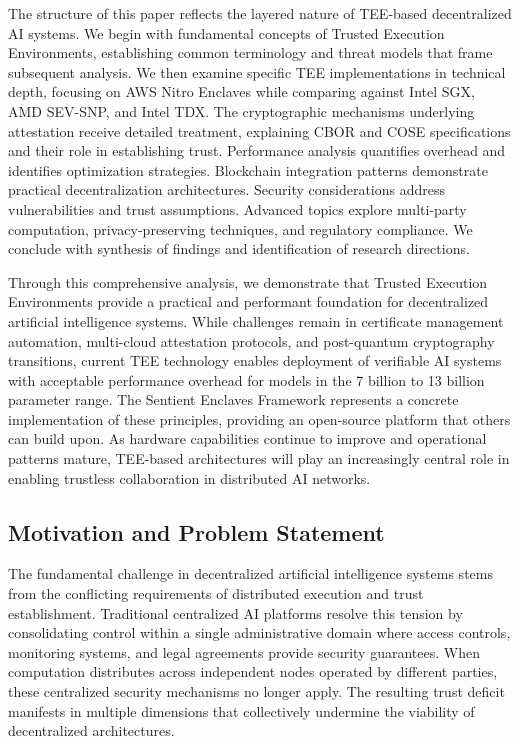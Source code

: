 The structure of this paper reflects the layered nature of TEE-based decentralized AI systems. We begin with fundamental concepts of Trusted Execution Environments, establishing common terminology and threat models that frame subsequent analysis. We then examine specific TEE implementations in technical depth, focusing on AWS Nitro Enclaves while comparing against Intel SGX, AMD SEV-SNP, and Intel TDX. The cryptographic mechanisms underlying attestation receive detailed treatment, explaining CBOR and COSE specifications and their role in establishing trust. Performance analysis quantifies overhead and identifies optimization strategies. Blockchain integration patterns demonstrate practical decentralization architectures. Security considerations address vulnerabilities and trust assumptions. Advanced topics explore multi-party computation, privacy-preserving techniques, and regulatory compliance. We conclude with synthesis of findings and identification of research directions.

Through this comprehensive analysis, we demonstrate that Trusted Execution Environments provide a practical and performant foundation for decentralized artificial intelligence systems. While challenges remain in certificate management automation, multi-cloud attestation protocols, and post-quantum cryptography transitions, current TEE technology enables deployment of verifiable AI systems with acceptable performance overhead for models in the 7 billion to 13 billion parameter range. The Sentient Enclaves Framework represents a concrete implementation of these principles, providing an open-source platform that others can build upon. As hardware capabilities continue to improve and operational patterns mature, TEE-based architectures will play an increasingly central role in enabling trustless collaboration in distributed AI networks.

\subsection{Motivation and Problem Statement}

The fundamental challenge in decentralized artificial intelligence systems stems from the conflicting requirements of distributed execution and trust establishment. Traditional centralized AI platforms resolve this tension by consolidating control within a single administrative domain where access controls, monitoring systems, and legal agreements provide security guarantees. When computation distributes across independent nodes operated by different parties, these centralized security mechanisms no longer apply. The resulting trust deficit manifests in multiple dimensions that collectively undermine the viability of decentralized architectures.

